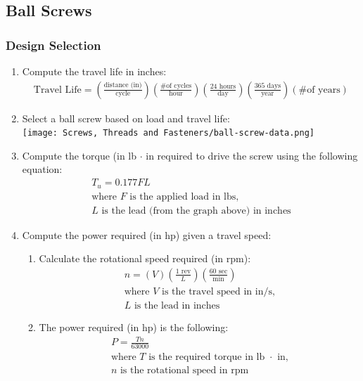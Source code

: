 \documentclass[11pt, fleqn]{article}
\begin{document}
\subsection{Ball Screws}
\subsubsection{Design Selection}
\begin{enumerate}
    \item Compute the travel life in inches:
    \begin{align*}
        \text{Travel Life}=\left(\frac{\text{distance (in)}}{\text{cycle}}\right)\left(\frac{\text{\# of cycles}}{\text{hour}}\right)\left(\frac{24\text{ hours}}{\text{day}}\right)\left(\frac{365 \text{ days}}{\text{year}}\right)(\text{\# of years})
    \end{align*}
    \item Select a ball screw based on load and travel life:\\
    \texttt{[image: Screws, Threads and Fasteners/ball-screw-data.png]}
    \item Compute the torque (in lb $\cdot$ in required to drive the screw using the following equation:
    \begin{align*}
        T_u = 0.177FL\\
        \text{where $F$ is the applied load in lbs,}\\
        \text{$L$ is the lead (from the graph above) in inches}
    \end{align*}
    \item Compute the power required (in hp) given a travel speed:
    \begin{enumerate}
        \item Calculate the rotational speed required (in rpm):
            \begin{align*}
                n = (V)\left(\frac{1\text{ rev}}{L}\right)\left(\frac{60\text{ sec}}{\text{min}}\right)\\
                \text{where $V$ is the travel speed in $\mathrm{in/s}$,}\\
                \text{$L$ is the lead in inches}
            \end{align*}
        \item The power required (in hp) is the following:
        \begin{align*}
            P=\frac{Tn}{63000}\\
            \text{where $T$ is the required torque in lb $\cdot$ in,}\\
            \text{$n$ is the rotational speed in rpm}
        \end{align*}
    \end{enumerate}
    
\end{enumerate}
\end{document}
